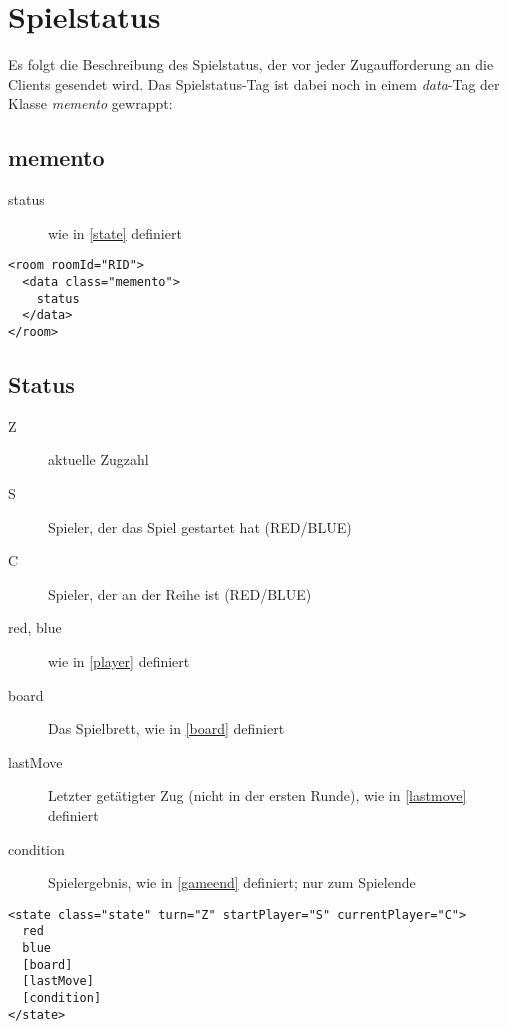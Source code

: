 \documentclass[12pt,a4paper, ngerman, oneside]{scrartcl}
\begin{document}
\section{Spielstatus}
Es folgt die Beschreibung des Spielstatus, der vor jeder Zugaufforderung an die Clients gesendet wird. Das Spielstatus-Tag ist dabei noch in einem \textit{data}-Tag der Klasse \textit{memento} gewrappt:
\subsection{memento}
\begin{description}
\item[status] wie in \ref{state} definiert
\end{description}
\begin{verbatim}
<room roomId="RID"> 
  <data class="memento"> 
  	status
  </data> 
</room>
\end{verbatim}

\subsection{\label{state}Status}
\begin{description}
\item[Z] aktuelle Zugzahl
\item[S] Spieler, der das Spiel gestartet hat (RED/BLUE)
\item[C] Spieler, der an der Reihe ist (RED/BLUE)
\item[red, blue] wie in \ref{player} definiert
\item[board] Das Spielbrett, wie in \ref{board} definiert
\item[lastMove] Letzter getätigter Zug (nicht in der ersten Runde), wie in
\ref{lastmove} definiert
\item[condition] Spielergebnis, wie in \ref{gameend} definiert; nur zum Spielende
\end{description}
\begin{verbatim}
<state class="state" turn="Z" startPlayer="S" currentPlayer="C">
  red
  blue
  [board]
  [lastMove]
  [condition]
</state>

\end{verbatim}
\end{document}
